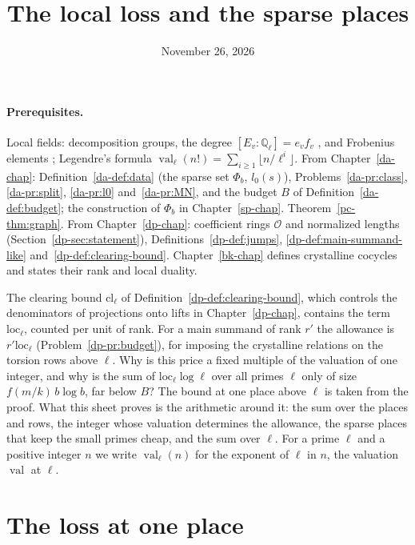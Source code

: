 \documentclass[reqno]{amsart}
\title{The local loss and the sparse places}
\author{}
\date{November 26, 2026}
\newcounter{chap}
\theoremstyle{definition}
\theoremstyle{plain}
\newcommand{\Q}{\mathbb{Q}}
\newcommand{\Oc}{\mathcal{O}}
\newcommand{\val}{\operatorname{val}}
\newcommand{\loc}{\mathrm{loc}}
\newcommand{\cl}{\mathrm{cl}}
\begin{document}
\maketitle
{}\label{chap}

\paragraph{Prerequisites.}
Local fields: decomposition groups, the degree \([E_v : \Q_\ell] = e_vf_v\) \cite[Ch.~II, \S2, Cor.~1 to Prop.~3]{SLF}, and Frobenius elements \cite[Ch.~IV]{SLF}; Legendre's formula \(\val_\ell(n!) = \sum_{i \ge 1}\lfloor n/\ell^i\rfloor\).  From Chapter~\ref{da-chap}: Definition~\ref{da-def:data} (the sparse set \(\Phi_b\), \(l_0(s)\)), Problems~\ref{da-pr:class}, \ref{da-pr:split}, \ref{da-pr:l0} and~\ref{da-pr:MN}, and the budget \(B\) of Definition~\ref{da-def:budget}; the construction of \(\Phi_b\) in Chapter~\ref{sp-chap}.  Theorem~\ref{pc-thm:graph}.  From Chapter~\ref{dp-chap}: coefficient rings \(\Oc\) and normalized lengths (Section~\ref{dp-sec:statement}), Definitions~\ref{dp-def:jumps}, \ref{dp-def:main-summand-like} and~\ref{dp-def:clearing-bound}.  Chapter~\ref{bk-chap} defines crystalline cocycles and states their rank and local duality.

\medskip
The clearing bound \(\cl_\ell\) of Definition~\ref{dp-def:clearing-bound}, which controls the denominators of projections onto lifts in Chapter~\ref{dp-chap}, contains the term \(\loc_\ell\), counted per unit of rank. For a main summand of rank \(r'\) the allowance is \(r'\loc_\ell\) (Problem~\ref{dp-pr:budget}), for imposing the crystalline relations on the torsion rows above \(\ell\).  Why is this price a fixed multiple of the valuation of one integer, and why is the sum of \(\loc_\ell\log\ell\) over all primes \(\ell\) only of size \(f(m/k)\,b\log b\), far below \(B\)?  The bound at one place above \(\ell\) is taken from the proof.  What this sheet proves is the arithmetic around it: the sum over the places and rows, the integer whose valuation determines the allowance, the sparse places that keep the small primes cheap, and the sum over \(\ell\).  For a prime \(\ell\) and a positive integer \(n\) we write \(\val_\ell(n)\) for the exponent of \(\ell\) in \(n\), the valuation \(\val\) at \(\ell\).

\section{The loss at one place}\label{sec:loss}
\end{document}
